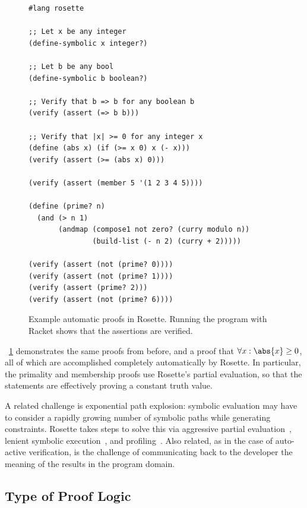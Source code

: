 \begin{figure}[ht]
\begin{verbatim}
#lang rosette

;; Let x be any integer
(define-symbolic x integer?)

;; Let b be any bool
(define-symbolic b boolean?)

;; Verify that b => b for any boolean b
(verify (assert (=> b b)))

;; Verify that |x| >= 0 for any integer x
(define (abs x) (if (>= x 0) x (- x)))
(verify (assert (>= (abs x) 0)))

(verify (assert (member 5 '(1 2 3 4 5))))

(define (prime? n)
  (and (> n 1)
       (andmap (compose1 not zero? (curry modulo n))
               (build-list (- n 2) (curry + 2)))))

(verify (assert (not (prime? 0))))
(verify (assert (not (prime? 1))))
(verify (assert (prime? 2)))
(verify (assert (not (prime? 6))))
\end{verbatim}
    \caption{Example automatic proofs in Rosette. Running the program with
    Racket shows that the assertions are verified.}\label{F:rosette}
\end{figure}

\figurename~\ref{F:rosette} demonstrates the same proofs from before, and a
proof that \(\forall x: \abs{x} \ge 0\), all of which are accomplished
completely automatically by Rosette. In particular, the primality and membership
proofs use Rosette's partial evaluation, so that the statements are effectively
proving a constant truth value.

A related challenge is exponential path explosion: symbolic evaluation may have
to consider a rapidly growing number of symbolic paths while generating
constraints. Rosette takes steps to solve this via aggressive partial
evaluation~\cite{Torlak_2013,Torlak_2014}, lenient symbolic
execution~\cite{Chang_2018}, and
profiling~\cite{Bornholt_2018,Porncharoenwase_2020}. Also related, as in the
case of auto-active verification, is the challenge of communicating back to the
developer the meaning of the results in the program domain.

\subsection{Type of Proof Logic}\label{S:t_logic}

